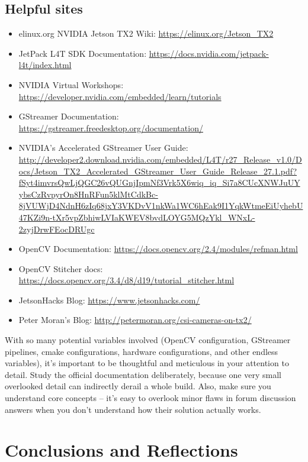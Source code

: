 \documentclass[letterpaper,10pt,serif,draftclsnofoot,onecolumn,compsoc,titlepage]{IEEEtran}
\begin{document}
\subsection{Helpful sites}
\begin{itemize}
	\item elinux.org NVIDIA Jetson TX2 Wiki: \url{https://elinux.org/Jetson_TX2}
	\item JetPack L4T SDK Documentation: \url{https://docs.nvidia.com/jetpack-l4t/index.html}
	\item NVIDIA Virtual Workshops: \url{https://developer.nvidia.com/embedded/learn/tutorials}
	\item GStreamer Documentation: \url{https://gstreamer.freedesktop.org/documentation/}
	\item NVIDIA's Accelerated GStreamer User Guide: \url{http://developer2.download.nvidia.com/embedded/L4T/r27_Release_v1.0/Docs/Jetson_TX2_Accelerated_GStreamer_User_Guide_Release_27.1.pdf?fSyt4imvrsQwLjQGC26vQUGnjIpmNf3Vrk5X6wiq_iq_Si7a8CUcXNWJuUYybsCzRvpyrOn8HnRFun5klMtCdkBc-8jVUWjD4NdnH6zIq68jxY3VKDvV1nkWa1WC6hEak9I1YqkWtmeEiUyhebU47KZi9n-tXr5vpZbhiwLVIaKWEV8bvdLOYG5MQzYkl_WNxL-2zyjDrwFEocDRUgc}
	\item OpenCV Documentation: \url{https://docs.opencv.org/2.4/modules/refman.html}
	\item OpenCV Stitcher docs: \url{https://docs.opencv.org/3.4/d8/d19/tutorial_stitcher.html}
	\item JetsonHacks Blog: \url{https://www.jetsonhacks.com/}
	\item Peter Moran's Blog: \url{http://petermoran.org/csi-cameras-on-tx2/}
\end{itemize}

With so many potential variables involved (OpenCV configuration, GStreamer pipelines, 
cmake configurations, hardware configurations, and other endless variables), 
it's important to be thoughtful and meticulous in your attention to detail. 
Study the official documentation 
deliberately, because one very small overlooked detail can indirectly 
derail a whole build. Also, make sure you understand core concepts -- it's easy to 
overlook minor flaws in forum discussion answers when you don't understand how their 
solution actually works.  \\

\newpage

\section{Conclusions and Reflections}
\end{document}
